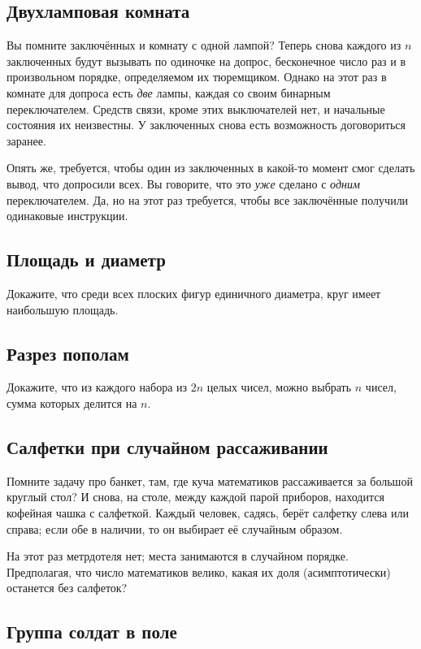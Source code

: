 \subsection*{Двухламповая комната}%

Вы помните заключённых и комнату с одной лампой?
Теперь снова каждого из $n$ заключенных будут вызывать по одиночке на допрос, бесконечное число раз и в произвольном порядке, определяемом их тюремщиком.
Однако на этот раз в комнате для допроса есть \emph{две} лампы, каждая со своим бинарным переключателем.
Средств связи, кроме этих выключателей нет, и начальные состояния их неизвестны.
У заключенных снова есть возможность договориться заранее.

Опять же, требуется, чтобы один из заключенных в какой-то момент смог сделать вывод, что допросили всех.
Вы говорите, что это \emph{уже} сделано с \emph{одним} переключателем.
Да, но на этот раз требуется, чтобы все заключённые получили одинаковые инструкции.

\subsection*{Площадь и диаметр}

Докажите, что среди всех плоских фигур единичного диаметра, круг имеет наибольшую площадь.

\subsection*{Разрез пополам}
Докажите, что из каждого набора из $2n$ целых чисел, можно выбрать $n$ чисел, сумма которых делится на $n$.

\subsection*{Салфетки при случайном рассаживании}

Помните задачу про банкет, там, где куча математиков рассаживается за большой круглый стол?
И снова, на столе, между каждой парой приборов, находится кофейная чашка с салфеткой.
Каждый человек, садясь, берёт салфетку слева или справа;
если обе в наличии, то он выбирает её случайным образом.

На этот раз метрдотеля нет; места занимаются в случайном порядке.
Предполагая, что число математиков велико, какая их доля (асимптотически) останется без салфеток?

\subsection*{Группа солдат в поле}


